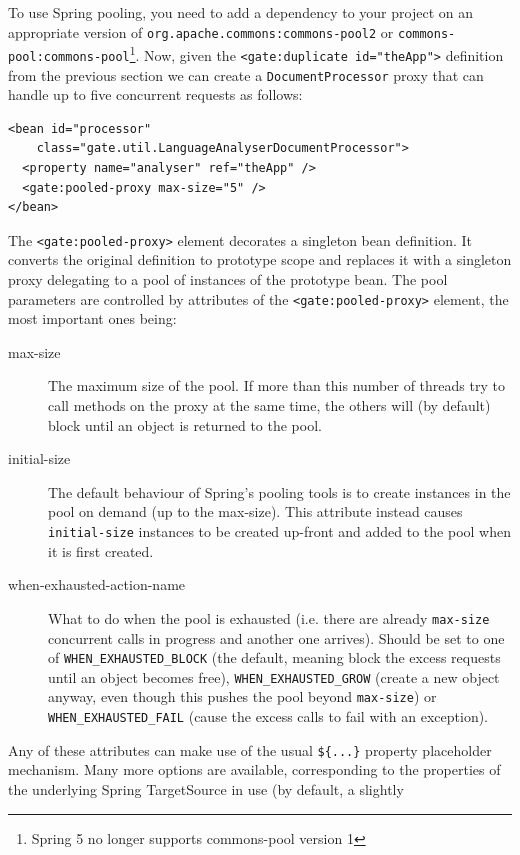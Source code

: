 To use Spring pooling, you need to add a dependency to your project on
an appropriate version of \verb!org.apache.commons:commons-pool2! or
\verb!commons-pool:commons-pool!\footnote{Spring 5 no longer supports
commons-pool version 1}.  Now, given the \verb|<gate:duplicate id="theApp">|
definition from the previous section we can create a \verb|DocumentProcessor|
proxy that can handle up to five concurrent requests as follows:
\begin{small}\begin{verbatim}
<bean id="processor"
    class="gate.util.LanguageAnalyserDocumentProcessor">
  <property name="analyser" ref="theApp" />
  <gate:pooled-proxy max-size="5" />
</bean>
\end{verbatim}\end{small}
%
The \verb|<gate:pooled-proxy>| element decorates a singleton bean definition.
It converts the original definition to prototype scope and replaces it with a
singleton proxy delegating to a pool of instances of the prototype bean.  The
pool parameters are controlled by attributes of the \verb|<gate:pooled-proxy>|
element, the most important ones being:
\begin{description}
\item[max-size] The maximum size of the pool.  If more than this number of
  threads try to call methods on the proxy at the same time, the others will
  (by default) block until an object is returned to the pool.
\item[initial-size] The default behaviour of Spring's pooling tools is to
  create instances in the pool on demand (up to the max-size).  This attribute
  instead causes \texttt{initial-size} instances to be created up-front and
  added to the pool when it is first created.
\item[when-exhausted-action-name] What to do when the pool is exhausted (i.e.
  there are already \texttt{max-size} concurrent calls in progress and another
  one arrives).  Should be set to one of \verb|WHEN_EXHAUSTED_BLOCK| (the
  default, meaning block the excess requests until an object becomes free),
  \verb|WHEN_EXHAUSTED_GROW| (create a new object anyway, even though this
  pushes the pool beyond \texttt{max-size}) or \verb|WHEN_EXHAUSTED_FAIL|
  (cause the excess calls to fail with an exception).
\end{description}
%
Any of these attributes can make use of the usual \verb!${...}! property
placeholder mechanism.  Many more options are available, corresponding to the
properties of the underlying Spring TargetSource in use (by default, a slightly
